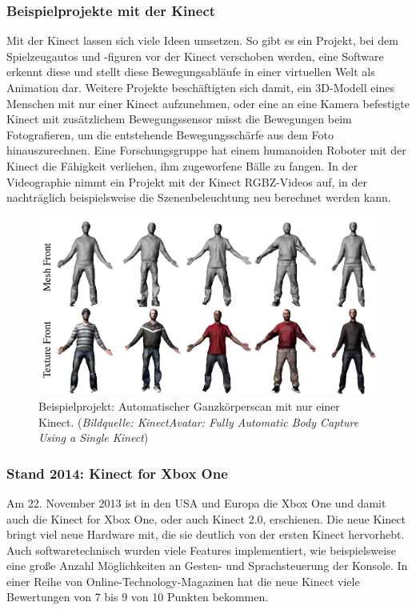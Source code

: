 \documentclass[12pt,a4paper,ngerman]{scrartcl}
\begin{document}
\subsubsection{Beispielprojekte mit der Kinect}

Mit der Kinect lassen sich viele Ideen umsetzen. So gibt es ein Projekt, bei dem Spielzeugautos und
-figuren vor der Kinect verschoben werden, eine Software erkennt diese und stellt diese Bewegungsabläufe
in einer virtuellen Welt als Animation dar.\cite{3dpuppetry} Weitere Projekte beschäftigten sich
damit, ein 3D-Modell eines Menschen mit nur einer Kinect aufzunehmen,\cite{kinectavatar} oder eine an eine Kamera
befestigte Kinect mit zusätzlichem Bewegungssensor misst die Bewegungen beim Fotografieren, um die
entstehende Bewegungsschärfe aus dem Foto hinauszurechnen.\cite{motiondeblurring} Eine Forschungsgruppe
hat einem humanoiden Roboter mit der Kinect die Fähigkeit verliehen, ihm zugeworfene Bälle zu fangen.\cite{kober}
In der Videographie nimmt ein Projekt mit der Kinect RGBZ-Videos auf, in der nachträglich beispielsweise die
Szenenbeleuchtung neu berechnet werden kann.\cite{rgbzvideos}

\begin{figure}[H]
    \centering
    \includegraphics[scale=0.3]{img/kinectavatar.jpg}
    \caption{Beispielprojekt: Automatischer Ganzkörperscan mit nur einer Kinect. ({\em Bildquelle: KinectAvatar: Fully Automatic Body Capture Using a Single Kinect\cite{kinectavatar}})}
\end{figure}

\subsubsection{Stand 2014: Kinect for Xbox One}
Am 22. November 2013 ist in den USA und Europa die Xbox One und damit auch die Kinect for Xbox One, oder auch Kinect 2.0, erschienen.\cite{kinect2:wikikinect} Die neue Kinect bringt viel neue Hardware mit, die sie deutlich von der ersten Kinect hervorhebt. Auch softwaretechnisch wurden viele Features implementiert, wie beispielsweise eine große Anzahl Möglichkeiten an Gesten- und Sprachsteuerung der Konsole.\cite{kinect2:gesturevoice} In einer Reihe von Online-Technology-Magazinen hat die neue Kinect viele Bewertungen von 7 bis 9 von 10 Punkten bekommen.\cite{kinect2:wikikinect}
\end{document}

